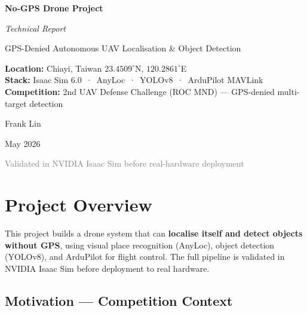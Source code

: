 \documentclass[11pt,a4paper]{article}
\begin{document}
\begin{titlepage}
  \centering
  \vspace*{2cm}
  {\Huge\bfseries No-GPS Drone Project\par}
  \vspace{0.8cm}
  {\Large\itshape Technical Report\par}
  \vspace{0.4cm}
  {\large GPS-Denied Autonomous UAV Localisation \& Object Detection\par}
  \vspace{2cm}
  \begin{mdframed}[backgroundcolor=gray!10,linecolor=gray!40]
    \centering
    \textbf{Location:} Chiayi, Taiwan \quad $23.4509^\circ$N, $120.2861^\circ$E\\[4pt]
    \textbf{Stack:} Isaac Sim 6.0 \,·\, AnyLoc \,·\, YOLOv8 \,·\, ArduPilot MAVLink\\[4pt]
    \textbf{Competition:} 2nd UAV Defense Challenge (ROC MND) --- GPS-denied multi-target detection
  \end{mdframed}
  \vspace{2cm}
  {\large Frank Lin\par}
  \vspace{0.3cm}
  {\normalsize May 2026\par}
  \vfill
  \textcolor{gray}{\small Validated in NVIDIA Isaac Sim before real-hardware deployment}
\end{titlepage}

\tableofcontents
\newpage

\section{Project Overview}
\label{sec:overview}

This project builds a drone system that can \textbf{localise itself and detect objects without GPS},
using visual place recognition (AnyLoc), object detection (YOLOv8), and ArduPilot for flight
control. The full pipeline is validated in NVIDIA Isaac Sim before deployment to real hardware.

\subsection*{Motivation --- Competition Context}
\end{document}
